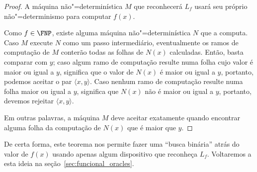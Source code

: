 \begin{proof}
    A máquina não"=determinística $M$ que reconhecerá $L_f$
    usará seu próprio não"=determinismo para computar $f(x)$.

    Como $f \in \FNP$,
    existe alguma máquina não"=determinística $N$ que a computa.
    Caso $M$ execute $N$ como um passo intermediário,
    eventualmente os ramos de computação de $M$
    conterão todas as folhas de $N(x)$ calculadas.
    Então, basta comparar com $y$;
    caso algum ramo de computação resulte numa folha
    cujo valor é maior ou igual a $y$,
    significa que o valor de $N(x)$ é maior ou igual a $y$,
    portanto, podemos aceitar o par $\langle x, y \rangle$.
    Caso nenhum ramo de computação resulte numa folha maior ou igual a $y$,
    significa que $N(x)$ não é maior ou igual a $y$,
    portanto, devemos rejeitar $\langle x, y \rangle$.

    Em outras palavras,
    a máquina $M$ deve aceitar exatamente quando encontrar
    alguma folha da computação de $N(x)$ que é maior que $y$.
\end{proof}

De certa forma,
este teorema nos permite fazer uma ``busca binária''
atrás do valor de $f(x)$
usando apenas algum dispositivo que reconheça $L_f$.
Voltaremos a esta ideia na seção~\ref{sec:funcional_oracles}.
